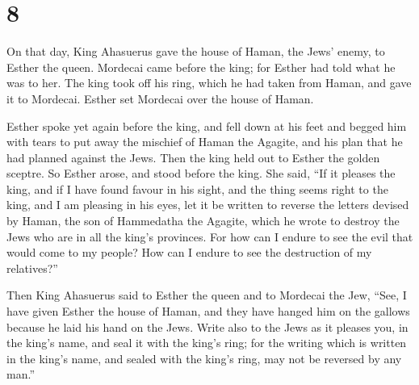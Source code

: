 \hypertarget{section-7}{%
\section{8}\label{section-7}}

 On that day, King Ahasuerus gave the house of Haman, the
Jews' enemy, to Esther the queen. Mordecai came before the king; for
Esther had told what he was to her.  The king took off his
ring, which he had taken from Haman, and gave it to Mordecai. Esther set
Mordecai over the house of Haman.

 Esther spoke yet again before the king, and fell down at
his feet and begged him with tears to put away the mischief of Haman the
Agagite, and his plan that he had planned against the Jews.
 Then the king held out to Esther the golden sceptre. So
Esther arose, and stood before the king.  She said, ``If
it pleases the king, and if I have found favour in his sight, and the
thing seems right to the king, and I am pleasing in his eyes, let it be
written to reverse the letters devised by Haman, the son of Hammedatha
the Agagite, which he wrote to destroy the Jews who are in all the
king's provinces.  For how can I endure to see the evil
that would come to my people? How can I endure to see the destruction of
my relatives?''

 Then King Ahasuerus said to Esther the queen and to
Mordecai the Jew, ``See, I have given Esther the house of Haman, and
they have hanged him on the gallows because he laid his hand on the
Jews.  Write also to the Jews as it pleases you, in the
king's name, and seal it with the king's ring; for the writing which is
written in the king's name, and sealed with the king's ring, may not be
reversed by any man.''

